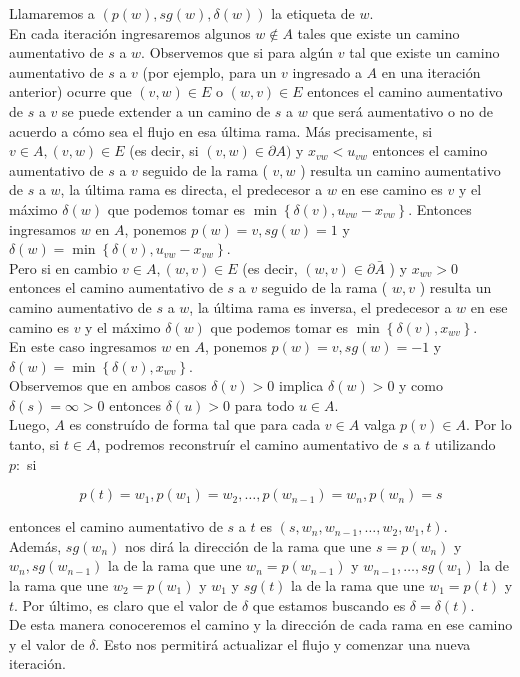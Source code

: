 \documentclass[10pt]{article}
\begin{document}
Llamaremos a $(p(w), s g(w), \delta(w))$ la etiqueta de $w$.\\
En cada iteración ingresaremos algunos $w \notin A$ tales que existe un camino aumentativo de $s$ a $w$. Observemos que si para algún $v$ tal que existe un camino aumentativo de $s$ a $v$ (por ejemplo, para un $v$ ingresado a $A$ en una iteración anterior) ocurre que $(v, w) \in E$ o $(w, v) \in E$ entonces el camino aumentativo de $s$ a $v$ se puede extender a un camino de $s$ a $w$ que será aumentativo o no de acuerdo a cómo sea el flujo en esa última rama. Más precisamente, si $v \in A,(v, w) \in E$ (es decir, si $(v, w) \in \partial A)$ y $x_{v w}<u_{v w}$ entonces el camino aumentativo de $s$ a $v$ seguido de la rama ( $v, w$ ) resulta un camino aumentativo de $s$ a $w$, la última rama es directa, el predecesor a $w$ en ese camino es $v$ y el máximo $\delta(w)$ que podemos tomar es $\min \left\{\delta(v), u_{v w}-x_{v w}\right\}$. Entonces ingresamos $w$ en $A$, ponemos $p(w)=v, s g(w)=1$ y $\delta(w)=\min \left\{\delta(v), u_{v w}-x_{v w}\right\}$.\\
Pero si en cambio $v \in A,(w, v) \in E$ (es decir, $(w, v) \in \partial \bar{A}$ ) y $x_{w v}>0$ entonces el camino aumentativo de $s$ a $v$ seguido de la rama ( $w, v$ ) resulta un camino aumentativo de $s$ a $w$, la última rama es inversa, el predecesor a $w$ en ese camino es $v$ y el máximo $\delta(w)$ que podemos tomar es $\min \left\{\delta(v), x_{w v}\right\}$.\\
En este caso ingresamos $w$ en $A$, ponemos $p(w)=v, s g(w)=-1$ y $\delta(w)=\min \left\{\delta(v), x_{w v}\right\}$.\\
Observemos que en ambos casos $\delta(v)>0$ implica $\delta(w)>0$ y como $\delta(s)=\infty>0$ entonces $\delta(u)>0$ para todo $u \in A$.\\
Luego, $A$ es construído de forma tal que para cada $v \in A$ valga $p(v) \in A$. Por lo tanto, si $t \in A$, podremos reconstruír el camino aumentativo de $s$ a $t$ utilizando $p:$ si

$$
p(t)=w_{1}, p\left(w_{1}\right)=w_{2}, \ldots, p\left(w_{n-1}\right)=w_{n}, p\left(w_{n}\right)=s
$$

entonces el camino aumentativo de $s$ a $t$ es $\left(s, w_{n}, w_{n-1}, \ldots, w_{2}, w_{1}, t\right)$.\\
Además, $s g\left(w_{n}\right)$ nos dirá la dirección de la rama que une $s=p\left(w_{n}\right)$ y $w_{n}, s g\left(w_{n-1}\right)$ la de la rama que une $w_{n}=p\left(w_{n-1}\right)$ y $w_{n-1}, \ldots, s g\left(w_{1}\right)$ la de la rama que une $w_{2}=p\left(w_{1}\right)$ y $w_{1}$ y $s g(t)$ la de la rama que une $w_{1}=p(t)$ y $t$. Por último, es claro que el valor de $\delta$ que estamos buscando es $\delta=\delta(t)$.\\
De esta manera conoceremos el camino y la dirección de cada rama en ese camino y el valor de $\delta$. Esto nos permitirá actualizar el flujo y comenzar una nueva iteración.
\end{document}
